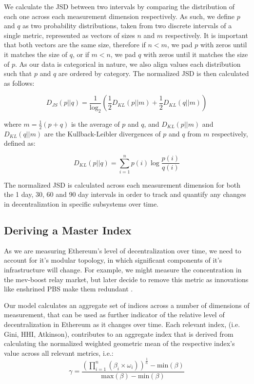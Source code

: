 \documentclass[conference]{IEEEtran}
\begin{document}
We calculate the JSD between two intervals by comparing the distribution of each one across each measurement dimension respectively.  As such, we define $p$ and $q$  as two probability distributions, taken from two discrete intervals of a single metric, represented as vectors of sizes $n$ and $m$ respectively. It is important that both vectors are the same size, therefore if $n < m$,  we pad $p$ with zeros until it matches the size of $q$, or if $m < n$, we pad $q$ with zeros until it matches the size of $p$.  As our data is categorical in nature, we also align values each distribution such that $p$ and $q$ are ordered by category.  The normalized JSD is then calculated as follows:


\[ D_{JS}(p||q) = \frac{1}{\log_2} \left( \frac{1}{2} D_{KL}(p||m) + \frac{1}{2} D_{KL}(q||m) \right) \]

\vspace{8pt}

where $m = \frac{1}{2} (p + q)$  is the average of $p$ and $q$, and $D_{KL}(p||m)$ and $D_{KL}(q||m)$ are the Kullback-Leibler divergences of $p$ and $q$  from $m$ respectively, defined as:

\[
D_{KL}(p||q) = \sum_{i=1}^{n} p(i) \log \frac{p(i)}{q(i)}
\]

\vspace{8pt}

The normalized JSD is calculated across each measurement dimension for both the 1 day, 30, 60 and 90 day intervals in order to track and quantify any changes in decentralization in specific subsystems over time.

\subsection{Deriving a Master Index}

As we are measuring Ethereum's level of decentralization over time, we need to account for it's modular topology, in which significant components of it's infrastructure will change.  For example, we might measure the concentration in the mev-boost relay market, but later decide to remove this metric as innovations like enshrined PBS make them redundant \cite{neuder2023}.

Our model calculates an aggregate set of indices across a number of dimensions of measurement, that can be used as further indicator of the relative level of decentralization in Ethereum as it changes over time.  Each relevant index, (i.e. Gini, HHI, Atkinson), contributes to an aggregate index that is derived from calculating the normalized weighted geometric mean of the respective index's value across all relevant metrics, i.e.:
\[ \gamma = \frac{{\left(\prod_{i=1}^{n} (\beta_i \times \omega_i)\right)^{\frac{1}{n}} - \text{min}\left(\beta\right)}}{{\text{max}\left(\beta\right) - \text{min}\left(\beta\right)}} \]
\end{document}
